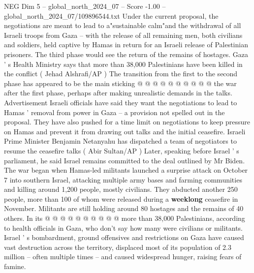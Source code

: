 \begin{textsample}{NEG Dim 5 – global\_north\_2024\_07 – Score -1.00 – global\_north\_2024\_07/109896544.txt}
Under the current proposal, the negotiations are meant to lead to a"sustainable calm"and the withdrawal of all Israeli troops from Gaza -- with the release of all remaining men, both civilians and soldiers, held captive by Hamas in return for an Israeli release of Palestinian prisoners.
The third phase would see the return of the remains of hostages.
Gaza ' s Health Ministry says that more than 38,000 Palestinians have been killed in the conflict ( Jehad Alshrafi/AP ) The transition from the first to the second phase has appeared to be the main sticking @ @ @ @ @ @ @ @ @ @ the war after the first phase, perhaps after making unrealistic demands in the talks.
Advertisement Israeli officials have said they want the negotiations to lead to Hamas ' removal from power in Gaza -- a provision not spelled out in the proposal.
They have also pushed for a time limit on negotiations to keep pressure on Hamas and prevent it from drawing out talks and the initial ceasefire.
Israeli Prime Minister Benjamin Netanyahu has dispatched a team of negotiators to resume the ceasefire talks ( Abir Sultan/AP ) Later, speaking before Israel ' s parliament, he said Israel remains committed to the deal outlined by Mr Biden.
The war began when Hamas-led militants launched a surprise attack on October 7 into southern Israel, attacking multiple army bases and farming communities and killing around 1,200 people, mostly civilians.
They abducted another 250 people, more than 100 of whom were released during a \textbf{weeklong} ceasefire in November.
Militants are still holding around 80 hostages and the remains of 40 others.
In its @ @ @ @ @ @ @ @ @ @ more than 38,000 Palestinians, according to health officials in Gaza, who don't say how many were civilians or militants.
Israel ' s bombardment, ground offensives and restrictions on Gaza have caused vast destruction across the territory, displaced most of its population of 2.3 million -- often multiple times -- and caused widespread hunger, raising fears of famine.

\end{textsample}
